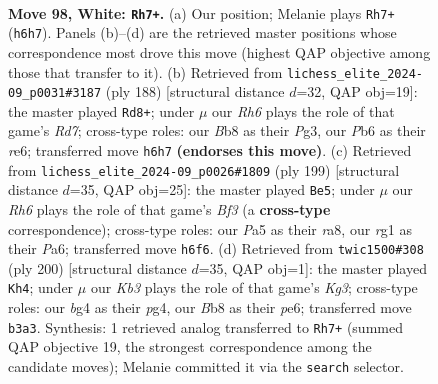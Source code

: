 \documentclass[11pt]{article}
\begin{document}
\begin{figure}[p]\centering
\begin{subfigure}{0.46\textwidth}\centering
\resizebox{\linewidth}{!}{%
\newchessgame
\chessboard[
  setfen={1B6/6k1/1P5R/P2N4/4B1b1/1K5p/8/6r1 w - - 1 98},
  showmover=false,
  pgfstyle=straightmove, color=movearrow, markmove={h6-h7}
]}
\caption{}
\end{subfigure}\hfill
\begin{subfigure}{0.46\textwidth}\centering
\resizebox{\linewidth}{!}{%
\newchessgame
\chessboard[
  setfen={4k3/3R4/4r3/2P4p/7B/3K1bP1/8/8 w - - 5 95},
  showmover=false,
  pgfstyle=straightmove, color=movearrow, markmove={d7-d8}
]}
\caption{}
\end{subfigure}
\\[4pt]
\begin{subfigure}{0.46\textwidth}\centering
\resizebox{\linewidth}{!}{%
\newchessgame
\chessboard[
  setfen={R7/8/p4b2/1b1k1K2/p7/2P5/1P6/4r3 b - - 7 100},
  showmover=false,
  pgfstyle=straightmove, color=movearrow, markmove={f6-e5}
]}
\caption{}
\end{subfigure}\hfill
\begin{subfigure}{0.46\textwidth}\centering
\resizebox{\linewidth}{!}{%
\newchessgame
\chessboard[
  setfen={8/8/1k1Bp1b1/4P3/r5p1/2R3K1/8/8 w - - 72 101},
  showmover=false,
  pgfstyle=straightmove, color=movearrow, markmove={g3-h4}
]}
\caption{}
\end{subfigure}
\caption{\textbf{Move 98, White: \texttt{Rh7+}.} (a) Our position; Melanie plays \texttt{Rh7+} (\texttt{h6h7}). Panels (b)--(d) are the retrieved master positions whose correspondence most drove this move (highest QAP objective among those that transfer to it). (b) Retrieved from \texttt{lichess\_elite\_2024-09\_p0031\#3187} (ply 188) [structural distance $d$=32, QAP obj=19]: the master played \texttt{Rd8+}; under $\mu$ our \emph{Rh6} plays the role of that game's \emph{Rd7}; cross-type roles: our \emph{B}b8 as their \emph{P}g3, our \emph{P}b6 as their \emph{r}e6; transferred move \texttt{h6h7} \textbf{(endorses this move)}. (c) Retrieved from \texttt{lichess\_elite\_2024-09\_p0026\#1809} (ply 199) [structural distance $d$=35, QAP obj=25]: the master played \texttt{Be5}; under $\mu$ our \emph{Rh6} plays the role of that game's \emph{Bf3} (a \textbf{cross-type} correspondence); cross-type roles: our \emph{P}a5 as their \emph{r}a8, our \emph{r}g1 as their \emph{P}a6; transferred move \texttt{h6f6}. (d) Retrieved from \texttt{twic1500\#308} (ply 200) [structural distance $d$=35, QAP obj=1]: the master played \texttt{Kh4}; under $\mu$ our \emph{Kb3} plays the role of that game's \emph{Kg3}; cross-type roles: our \emph{b}g4 as their \emph{p}g4, our \emph{B}b8 as their \emph{p}e6; transferred move \texttt{b3a3}. Synthesis: 1 retrieved analog transferred to \texttt{Rh7+} (summed QAP objective 19, the strongest correspondence among the candidate moves); Melanie committed it via the \texttt{search} selector.}
\label{fig:thought-m194}
\end{figure}
\end{document}
